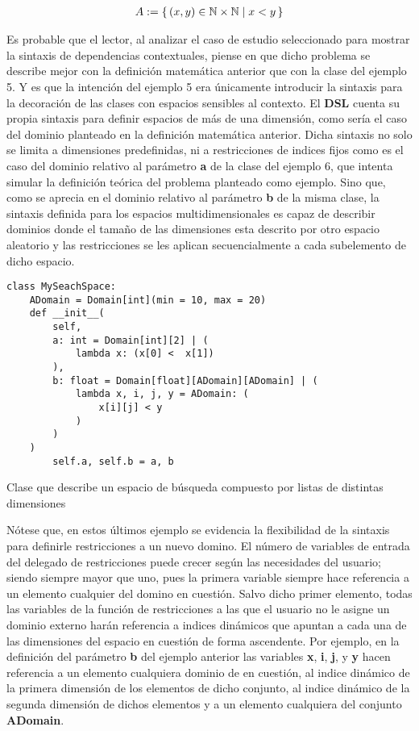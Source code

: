 \begin{align*}
    A := \{\,(x, y) \in \mathbb{N} \times \mathbb{N}\mid x < y\,\} \\
\end{align*}

Es probable que el lector, al analizar el caso de estudio seleccionado para mostrar la sintaxis de dependencias
contextuales, piense en que dicho problema se describe mejor con la definición matemática anterior que con la
clase del ejemplo 5. Y es que la intención del ejemplo 5 era únicamente introducir la sintaxis para la decoración
de las clases con espacios sensibles al contexto. El {\bf DSL} cuenta su propia sintaxis para definir espacios de más
de una dimensión, como sería el caso del dominio planteado en la definición matemática anterior. Dicha sintaxis
no solo se limita a dimensiones predefinidas, ni a restricciones de indices fijos como es el caso del dominio relativo
al parámetro {\bf a} de la clase del ejemplo 6, que intenta simular la definición teórica del problema planteado como ejemplo.
Sino que, como se aprecia en el dominio relativo al parámetro {\bf b} de la misma clase, la sintaxis definida para los espacios
multidimensionales es capaz de describir dominios donde el tamaño de las dimensiones esta descrito por otro espacio
aleatorio y las restricciones se les aplican secuencialmente a cada subelemento de dicho espacio.


\begin{listing}[!ht]
    \begin{verbatim}
class MySeachSpace:
    ADomain = Domain[int](min = 10, max = 20)
    def __init__(
        self, 
        a: int = Domain[int][2] | (
            lambda x: (x[0] <  x[1])
        ),
        b: float = Domain[float][ADomain][ADomain] | (
            lambda x, i, j, y = ADomain: (
                x[i][j] < y
            )
        )
    )
        self.a, self.b = a, b

    \end{verbatim}
    \caption{Clase que describe un espacio de búsqueda compuesto por listas de distintas dimensiones }
    \label{ex:class_list}
\end{listing}

\newpage
Nótese que, en estos últimos ejemplo se evidencia la flexibilidad de la sintaxis para definirle restricciones a un
nuevo domino. El número de variables de entrada del delegado de restricciones puede crecer según las necesidades
del usuario; siendo siempre mayor que uno, pues la primera variable siempre hace referencia a un elemento cualquier
del domino en cuestión. Salvo dicho primer elemento, todas las variables de la función de restricciones a las que
el usuario no le asigne un dominio externo harán referencia a indices dinámicos que apuntan a cada una de las
dimensiones del espacio en cuestión de forma ascendente. Por ejemplo, en la definición del parámetro {\bf b} del
ejemplo anterior las variables {\bf x}, {\bf i}, {\bf j}, y {\bf y} hacen referencia a un elemento cualquiera
dominio de en cuestión, al indice dinámico de la primera dimensión de los elementos de dicho conjunto, al indice dinámico
de la segunda dimensión de dichos elementos y a un elemento cualquiera del conjunto {\bf ADomain}.

